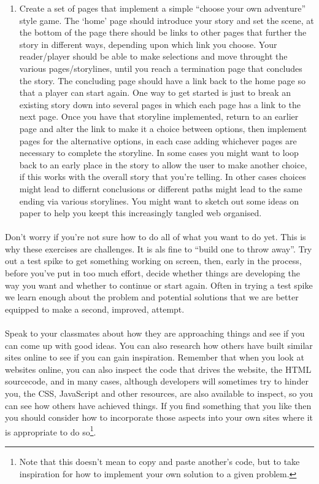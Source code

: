 \documentclass[10pt, a4paper, twosize]{article}
\begin{document}
\begin{enumerate}
\item Create a set of pages that implement a simple ``choose your own adventure'' style game. The `home' page should introduce your story and set the scene, at the bottom of the page there should be links to other pages that further the story in different ways, depending upon which link you choose. Your reader/player should be able to make selections and move throught the various pages/storylines, until you reach a termination page that concludes the story. The concluding page should have a link back to the home page so that a player can start again. One way to get started is just to break an existing story down into several pages in which each page has a link to the next page. Once you have that storyline implemented, return to an earlier page and alter the link to make it a choice between options, then implement pages for the alternative options, in each case adding whichever pages are necessary to complete the storyline. In some cases you might want to loop back to an early place in the story to allow the user to make another choice, if this works with the overall story that you're telling. In other cases choices might lead to differnt conclusions or different paths might lead to the same ending via various storylines. You might want to sketch out some ideas on paper to help you keept this increasingly tangled web organised.
\end{enumerate}

\paragraph{} Don't worry if you're not sure how to do all of what you want to do yet. This is why these exercises are challenges. It is als fine to ``build one to throw away''. Try out a test spike to get something working on screen, then, early in the process, before you've put in too much effort, decide whether things are developing the way you want and whether to continue or start again. Often in trying a test spike we learn enough about the problem and potential solutions that we are better equipped to make a second, improved, attempt.

\paragraph{} Speak to your classmates about how they are approaching things and see if you can come up with good ideas. You can also research how others have built similar sites online to see if you can gain inspiration. Remember that when you look at websites online, you can also inspect the code that drives the website, the HTML sourcecode, and in many cases, although developers will sometimes try to hinder you, the CSS, JavaScript and other resources, are also available to inspect, so you can see how others have achieved things. If you find something that you like then you should consider how to incorporate those aspects into your own sites where it is appropriate to do so\footnote{Note that this doesn't mean to copy and paste another's code, but to take inspiration for how to implement your own solution to a given problem.}.
\end{document}
